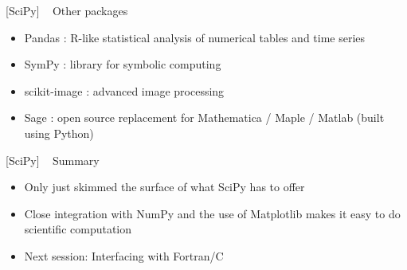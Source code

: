 \documentclass{article}
\begin{document}
    {[}SciPy{]} ~ Other packages

\begin{itemize}
\item
  Pandas : R-like statistical analysis of numerical tables and time
  series
\item
  SymPy : library for symbolic computing
\item
  scikit-image : advanced image processing
\item
  Sage : open source replacement for Mathematica / Maple / Matlab (built
  using Python)
\end{itemize}

    {[}SciPy{]} ~ Summary

\begin{itemize}
\item
  Only just skimmed the surface of what SciPy has to offer
\item
  Close integration with NumPy and the use of Matplotlib makes it easy
  to do scientific computation
\item
  Next session: Interfacing with Fortran/C
\end{itemize}


    
    
    
    
\end{document}
